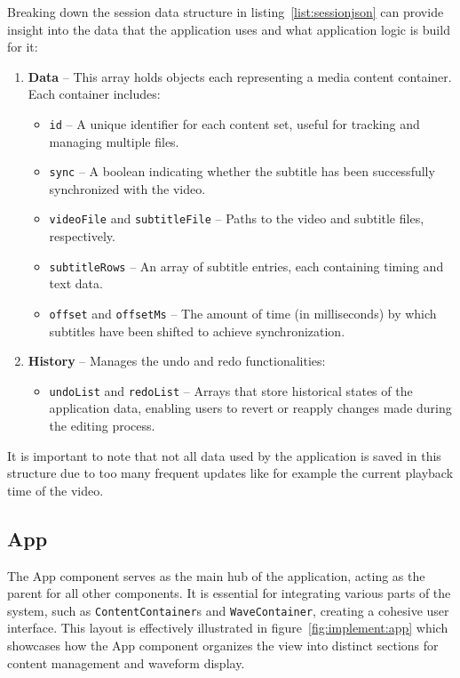 \noindent Breaking down the session data structure in listing~\ref{list:sessionjson} can provide insight into the data that the application uses and what application logic is build for it:
\begin{enumerate}
    \item \textbf{Data} -- This array holds objects each representing a media content container. Each container includes:
    \begin{itemize}
        \item \texttt{id} -- A unique identifier for each content set, useful for tracking and managing multiple files.
        \item \texttt{sync} -- A boolean indicating whether the subtitle has been successfully synchronized with the video.
        \item \texttt{videoFile} and \texttt{subtitleFile} -- Paths to the video and subtitle files, respectively.
        \item \texttt{subtitleRows} -- An array of subtitle entries, each containing timing and text data.
        \item \texttt{offset} and \texttt{offsetMs} -- The amount of time (in milliseconds) by which subtitles have been shifted to achieve synchronization.
    \end{itemize}
    \item \textbf{History} -- Manages the undo and redo functionalities:
    \begin{itemize}
        \item \texttt{undoList} and \texttt{redoList} -- Arrays that store historical states of the application data, enabling users to revert or reapply changes made during the editing process.
    \end{itemize}
\end{enumerate}

It is important to note that not all data used by the application is saved in this structure due to too many frequent updates like for example the current playback time of the video.

\subsection{App}
\label{implementation:app}

The App component serves as the main hub of the application, acting as the parent for all other components. It is essential for integrating various parts of the system, such as \texttt{ContentContainer}s and \texttt{WaveContainer}, creating a cohesive user interface. This layout is effectively illustrated in figure~\ref{fig:implement:app} which showcases how the App component organizes the view into distinct sections for content management and waveform display.

